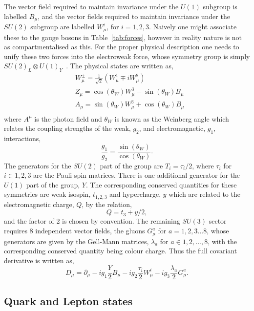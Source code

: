 The vector field required to maintain invariance under the $U(1)$ subgroup is labelled $B_{\mu}$, and the vector fields required to maintain invariance under the $SU(2)$ subgroup are labelled $W^{i}_{\mu}$, for $i=1,2,3$. Naively one might associate these to the \SM gauge bosons in Table~\ref{tab:forces}, however in reality nature is not as compartmentalised as this. For the proper physical description one needs to unify these two forces into the electroweak force, whose symmetry group is simply $SU(2)_{L}\otimes U(1)_{Y}$~\cite{Glashow,Weinberg,Salam}.  The physical states are written as,
\begin{align}
  & W_{\mu}^{\pm} = \frac{1}{\sqrt{2}}(W^{1}_{\mu}\mp iW^{2}_{\mu})\\
  & Z_{\mu} = \cos(\theta_{W})W^{3}_{\mu}-\sin(\theta_{W})B_{\mu}\\
  & A_{\mu} = \sin(\theta_{W})W^{3}_{\mu}+\cos(\theta_{W})B_{\mu}\\
\end{align}
where $A^{\mu}$ is the photon field and $\theta_{W}$ is known as the Weinberg angle which relates the coupling strengths of the weak, $g_{2}$, and electromagnetic, $g_{1}$, interactions,
\begin{equation}
  \frac{g_{1}}{g_{2}} = \frac{\sin(\theta_{W})}{\cos(\theta_{W})}.
\end{equation}
The generators for the $SU(2)$ part of the group are $T_{i}=\tau_{i}/2$, where $\tau_{i}$ for $i\in{1,2,3}$ are the Pauli spin matrices. There is one additional generator for the $U(1)$ part of the group, $Y$. The corresponding conserved quantities for these symmetries are weak isospin, $t_{1,2,3}$ and hypercharge, $y$ which are related to the electromagnetic charge, $Q$, by the relation, 
\begin{equation}
  Q = t_{3}+y/2,
\end{equation}
 and the factor of 2 is chosen by convention. The remaining $SU(3)$ sector requires 8 independent vector fields, the gluons $G_{\mu}^{a}$ for $a=1,2,3...8$, whose generators are given by the Gell-Mann matrices, $\lambda_{a}$ for $a\in{1,2,...,8}$, with the corresponding conserved quantity being colour charge. Thus the full covariant derivative is written as,
\begin{equation}
  D_{\mu} = \partial_{\mu}-ig_{1}\frac{Y}{2}B_{\mu} -ig_{2}\frac{\tau_{i}}{2}W_{\mu}^{i} -ig_{3}\frac{\lambda_{a}}{2}G_{\mu}^{a}.
  \label{eq:cov_der}
\end{equation}

\subsection{Quark and Lepton states}

